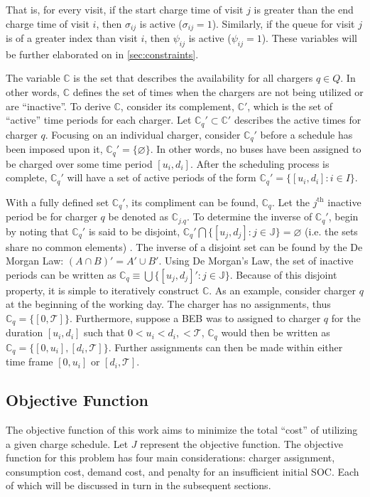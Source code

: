 \documentclass[11pt,a4paper,final]{article}
\newcommand{\T}{\mathcal{T}}                %
\newcommand{\C}{\mathbb{C}}                 %
\newcommand{\Qset}{Q}                       %
\newcommand{\Jsetq}{\mathbb{J}}             %
\begin{document}
That is, for every visit, if the start charge time of visit \(j\) is greater than the end charge time of visit \(i\), then
\(\sigma_{ij}\) is active (\(\sigma_{ij} = 1\)). Similarly, if the queue for visit \(j\) is of a greater index than visit \(i\), then
\(\psi_{ij}\) is active (\(\psi_{ij} = 1\)). These variables will be further elaborated on in \ref{sec:constraints}.

The variable \(\C\) is the set that describes the availability for all chargers \(q \in \Qset\). In other words, \(\C\) defines
the set of times when the chargers are not being utilized or are ``inactive''. To derive \(\C\), consider its complement,
\(\C'\), which is the set of ``active'' time periods for each charger. Let \(\C_q' \subset \C'\) describes the active times for
charger \(q\). Focusing on an individual charger, consider \(\C_q'\) before a schedule has been imposed upon it, \(\C_q' = \{
\varnothing \}\). In other words, no buses have been assigned to be charged over some time period \([u_i, d_i]\). After the
scheduling process is complete, \(\C_q'\) will have a set of active periods of the form \(\C_q' = \{[u_i, d_i]: i \in I\}\).

With a fully defined set \(\C_q'\), its compliment can be found, \(\C_q\). Let the \(j^{\text{th}}\) inactive period be for
charger \(q\) be denoted as \(\C_{j.q}\). To determine the inverse of \(\C_q'\), begin by noting that \(\C_q'\) is said to be
disjoint, \(\C_q' \bigcap \{[u_j, d_j] : j \in \Jsetq\} = \varnothing\) (i.e. the sets share no common elements)
\cite{halmos-1974-naive-set-theor}. The inverse of a disjoint set can be found by the De Morgan Law: \((A \cap B)' = A' \cup
B'\). Using De Morgan's Law, the set of inactive periods can be written as \(\C_q \equiv \bigcup \{[u_j, d_j]': j \in \Jsetq\}\).
Because of this disjoint property, it is simple to iteratively construct \(\C\). As an example, consider charger \(q\) at
the beginning of the working day. The charger has no assignments, thus \(\C_q = \{[0, \T]\}\). Furthermore, suppose a BEB
was to assigned to charger \(q\) for the duration \([u_i, d_i]\) such that \(0 < u_i < d_i, < \T\), \(\C_q\) would then be
written as \(\C_q = \{[0, u_i], [d_i, \T]\}\). Further assignments can then be made within either time frame \([0, u_i]\) or
\([d_i, \T]\).

\subsection{Objective Function}
\label{sec:objective-function}
The objective function of this work aims to minimize the total ``cost'' of utilizing a given charge schedule. Let \(J\)
represent the objective function. The objective function for this problem has four main considerations: charger
assignment, consumption cost, demand cost, and penalty for an insufficient initial SOC. Each of which will be discussed
in turn in the subsequent sections.
\end{document}
